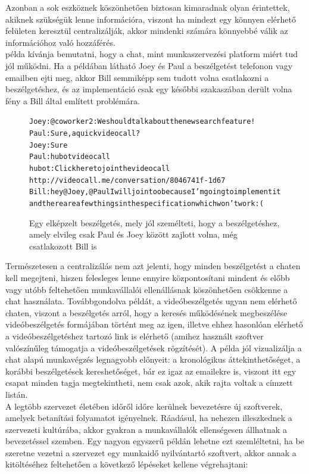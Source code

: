 Azonban a sok eszköznek köszönhetően biztosan kimaradnak olyan érintettek, akiknek szükségük lenne információra, viszont ha mindezt egy könnyen elérhető felületen keresztül centralizálják, akkor mindenki számára könnyebbé válik az információhoz való hozzáférés.\\
 példa kívánja bemutatni, hogy a chat, mint munkaszervezési platform miért tud jól működni. Ha a példában látható Joey és Paul a beszélgetést telefonon vagy emailben ejti meg, akkor Bill semmiképp sem tudott volna csatlakozni a beszélgetéshez, és az implementáció csak egy későbbi szakaszában derült volna fény a Bill által említett problémára.

\begin{figure}[H]
  \begin{alltt}
Joey: @coworker2: We should talk about the new search feature!
Paul: Sure, a quick videocall?
Joey: Sure
Paul: hubot videocall
hubot: Click here to join the video call
       http://videocall.me/conversation/8046741f-1d67
Bill: hey @Joey, @Paul I will join too because I'm going to implement it 
      and there are a few things in the specification which won't work :(
  \end{alltt}
  \caption[DUMMY]%
    {Egy elképzelt beszélgetés, mely jól személteti, hogy a beszélgetéshez, amely elvileg csak Paul és Joey között zajlott volna, még csatlakozott Bill is}%
    \label{lst:search_feature_call}
\end{figure}

Természetesen a centralizálás nem azt jelenti, hogy minden beszélgetést a chaten kell megejteni, hiszen felesleges lenne ennyire központosítani mindent és előbb vagy utóbb feltehetően munkavállalói ellenállásnak köszönhetően csökkenne a chat használata. Továbbgondolva  példát, a videóbeszélgetés ugyan nem elérhető chaten, viszont a beszélgetés arról, hogy a keresés működésének megbeszélése videóbeszélgetés formájában történt meg az igen, illetve ehhez hasonlóan elérhető a videóbeszélgetéshez tartozó link is elérhető (amihez használt szoftver valószínűleg támogatja a videóbeszélgetések rögzítését). A példa jól vizualizálja a chat alapú munkavégzés legnagyobb előnyeit: a kronológikus áttekinthetőséget, a korábbi beszélgetések kereshetőséget, bár ez igaz az emailekre is, viszont itt egy csapat minden tagja megtekintheti, nem csak azok, akik rajta voltak a címzett listán.\\

A legtöbb szervezet életében időről időre kerülnek bevezetésre új szoftverek, amelyek betanítási folyamatot igényelnek. Ráadásul, ha nehezen illeszkednek a szervezeti kultúrába, akkor gyakran a munkavállalók ellenségesen állhatnak a bevezetéssel szemben. Egy nagyon egyszerű példán lehetne ezt szemléltetni, ha be szeretne vezetni a szervezet egy munkaidő nyilvántartó szoftvert, akkor annak a kitöltéséhez feltehetően a következő lépéseket kellene végrehajtani:

